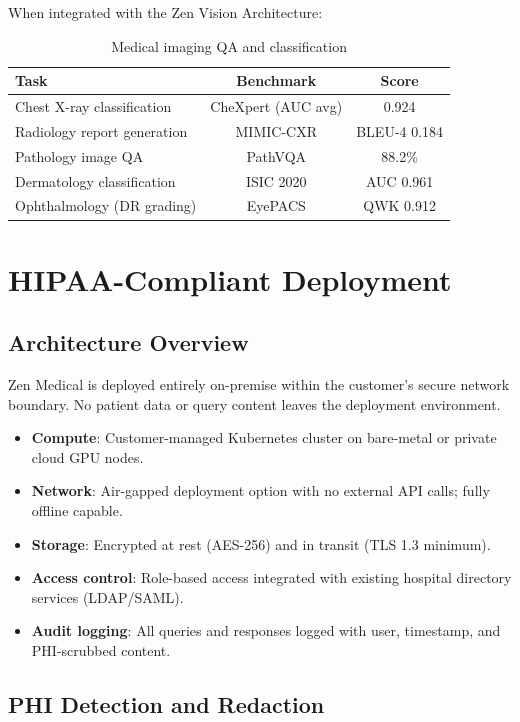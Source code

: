 \documentclass[11pt,a4paper]{article}
\begin{document}
When integrated with the Zen Vision Architecture:

\begin{table}[H]
\centering
\caption{Medical imaging QA and classification}
\label{tab:medical_imaging}
\begin{tabular}{lcc}
\toprule
Task & Benchmark & Score \\
\midrule
Chest X-ray classification & CheXpert (AUC avg) & 0.924 \\
Radiology report generation & MIMIC-CXR & BLEU-4 0.184 \\
Pathology image QA & PathVQA & 88.2\% \\
Dermatology classification & ISIC 2020 & AUC 0.961 \\
Ophthalmology (DR grading) & EyePACS & QWK 0.912 \\
\bottomrule
\end{tabular}
\end{table}

\section{HIPAA-Compliant Deployment}

\subsection{Architecture Overview}

Zen Medical is deployed entirely on-premise within the customer's secure network boundary. No patient data or query content leaves the deployment environment.

\begin{itemize}
  \item \textbf{Compute}: Customer-managed Kubernetes cluster on bare-metal or private cloud GPU nodes.
  \item \textbf{Network}: Air-gapped deployment option with no external API calls; fully offline capable.
  \item \textbf{Storage}: Encrypted at rest (AES-256) and in transit (TLS 1.3 minimum).
  \item \textbf{Access control}: Role-based access integrated with existing hospital directory services (LDAP/SAML).
  \item \textbf{Audit logging}: All queries and responses logged with user, timestamp, and PHI-scrubbed content.
\end{itemize}

\subsection{PHI Detection and Redaction}
\end{document}

